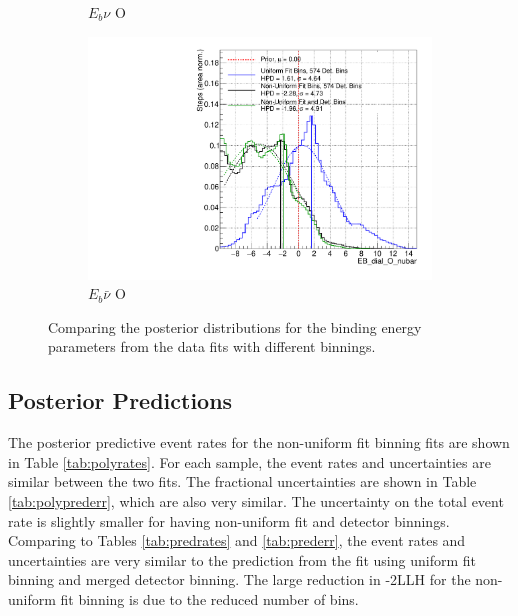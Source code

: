 \begin{figure}
\begin{subfigure}{.48\textwidth}
  \caption{$E_{b}\nu$ O}\label{fig:polyEbOnu}
\end{subfigure}
\begin{subfigure}{.48\textwidth}
  \centering
  \includegraphics[width=0.73\linewidth]{figs/PolyComp_EB_dial_O_nubar}
  \caption{$E_{b}\bar{\nu}$ O}
\end{subfigure}
\caption{Comparing the posterior distributions for the binding energy parameters from the data fits with different binnings.}
\label{fig:polyEbdata}
\end{figure}

\subsection{Posterior Predictions}

The posterior predictive event rates for the non-uniform fit binning fits are shown in Table \ref{tab:polyrates}. For each sample, the event rates and uncertainties are similar between the two fits. The fractional uncertainties are shown in Table \ref{tab:polyprederr}, which are also very similar. The uncertainty on the total event rate is slightly smaller for having non-uniform fit and detector binnings. Comparing to Tables \ref{tab:predrates} and \ref{tab:prederr}, the event rates and uncertainties are very similar to the prediction from the fit using uniform fit binning and merged detector binning. The large reduction in -2LLH for the non-uniform fit binning is due to the reduced number of bins. 

